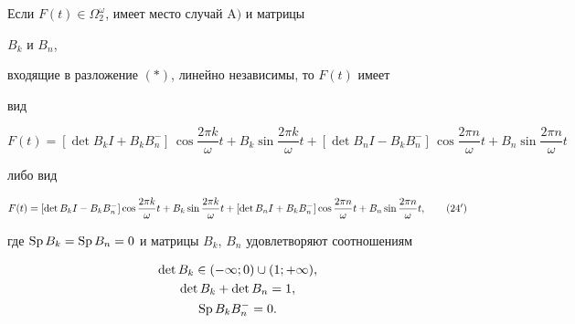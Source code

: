  


 


\begin{thm} 


Если $F(t)\in\Omega^\omega_2$, имеет место случай $\mathrm A)$ и матрицы 


$B_k$ и $B_n$, 


входящие в разложение $(\ast)$, линейно независимы, то $F(t)$ имеет 


вид 


\begin{equation} 


F(t)=[\det B_k I+B_k B^-_n]\,\cos\frac{2\pi k}{\omega}t 


+B_k\sin\frac{2\pi k}{\omega}t+[\det B_n I-B_k B^-_n]\,


\cos\frac{2\pi n}{\omega}t+B_n\sin\frac{2\pi n}{\omega}t 


\end{equation} 


либо вид 


\begin{equation} 


F(t)=[\det B_k I-B_k B^-_n]\cos\frac{2\pi k}{\omega}t 


+B_k\sin\frac{2\pi k}{\omega}t+[\det B_n I+B_k B^-_n] 


\cos\frac{2\pi n}{\omega}t+B_n\sin\frac{2\pi n}{\omega}t, 


\tag{24${}'$} 


\end{equation} 


где $\operatorname{Sp} B_k=\operatorname{Sp} B_n=0$ и матрицы $B_k$, $B_n$ удовлетворяют соотношениям 


\begin{gather} 


\det B_k\in(-\infty;0)\cup(1;+\infty),\\ 


\det B_k+\det B_n=1,\\ 


\Sp B_k B^-_n=0. 


\end{gather} 


\end{thm} 


 






